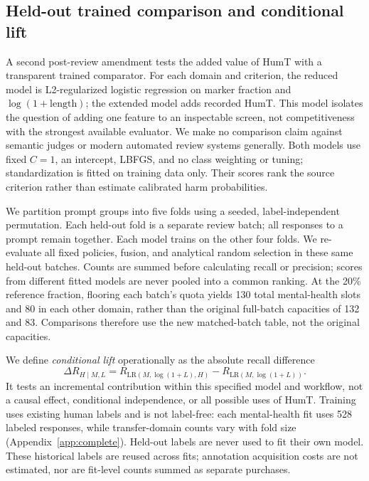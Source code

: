 \documentclass[manuscript,screen,review,anonymous]{acmart}
\begin{document}
\subsection{Held-out trained comparison and conditional lift}
A second post-review amendment tests the added value of HumT with a transparent trained comparator. For each domain and criterion, the reduced model is L2-regularized logistic regression on marker fraction and $\log(1+\mathrm{length})$; the extended model adds recorded HumT. This model isolates the question of adding one feature to an inspectable screen, not competitiveness with the strongest available evaluator. We make no comparison claim against semantic judges or modern automated review systems generally. Both models use fixed $C=1$, an intercept, LBFGS, and no class weighting or tuning; standardization is fitted on training data only. Their scores rank the source criterion rather than estimate calibrated harm probabilities.

We partition prompt groups into five folds using a seeded, label-independent permutation. Each held-out fold is a separate review batch; all responses to a prompt remain together. Each model trains on the other four folds. We re-evaluate all fixed policies, fusion, and analytical random selection in these same held-out batches. Counts are summed before calculating recall or precision; scores from different fitted models are never pooled into a common ranking. At the 20\% reference fraction, flooring each batch's quota yields 130 total mental-health slots and 80 in each other domain, rather than the original full-batch capacities of 132 and 83. Comparisons therefore use the new matched-batch table, not the original capacities.

We define \emph{conditional lift} operationally as the absolute recall difference
\begin{equation}
\Delta R_{H\mid M,L}=R_{\mathrm{LR}(M,\log(1+L),H)}-R_{\mathrm{LR}(M,\log(1+L))}.
\end{equation}
It tests an incremental contribution within this specified model and workflow, not a causal effect, conditional independence, or all possible uses of HumT. Training uses existing human labels and is not label-free: each mental-health fit uses 528 labeled responses, while transfer-domain counts vary with fold size (Appendix~\ref{app:complete}). Held-out labels are never used to fit their own model. These historical labels are reused across fits; annotation acquisition costs are not estimated, nor are fit-level counts summed as separate purchases.
\end{document}
